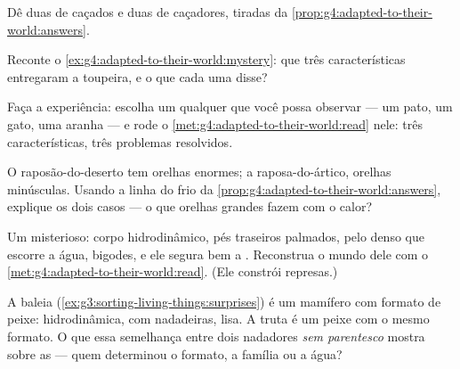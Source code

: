 \begin{exercise}[$\star$]\label{exo:g4:adapted-to-their-world:6}
Dê duas  de  caçados e duas de caçadores, tiradas
da \cref{prop:g4:adapted-to-their-world:answers}.
\end{exercise}

\begin{exercise}[$\star$]\label{exo:g4:adapted-to-their-world:7}
Reconte o \cref{ex:g4:adapted-to-their-world:mystery}: que três
características entregaram a toupeira, e o que cada uma disse?
\end{exercise}

\begin{exercise}[$\star$]\label{exo:g4:adapted-to-their-world:8}
Faça a experiência: escolha um  qualquer que você possa
observar --- um pato, um gato, uma aranha --- e rode o
\cref{met:g4:adapted-to-their-world:read} nele: três características,
três problemas resolvidos.
\end{exercise}

\begin{exercise}[$\star\star$]\label{exo:g4:adapted-to-their-world:9}
O raposão-do-deserto tem orelhas enormes; a raposa-do-ártico, orelhas
minúsculas. Usando a linha do frio da
\cref{prop:g4:adapted-to-their-world:answers}, explique os dois casos
--- o que orelhas grandes fazem com o calor?
\end{exercise}

\begin{exercise}[$\star\star$]\label{exo:g4:adapted-to-their-world:10}
Um  misterioso: corpo hidrodinâmico, pés traseiros palmados,
pelo denso que escorre a água, bigodes, e ele segura bem a
. Reconstrua o mundo dele com o
\cref{met:g4:adapted-to-their-world:read}. (Ele constrói represas.)
\end{exercise}

\begin{exercise}[$\star\star\star$]\label{exo:g4:adapted-to-their-world:11}
A baleia (\cref{ex:g3:sorting-living-things:surprises}) é um
mamífero com formato de peixe: hidrodinâmica, com nadadeiras, lisa. A
truta é um peixe com o mesmo formato. O que essa semelhança entre
dois nadadores \emph{sem parentesco} mostra sobre as  ---
quem determinou o formato, a família ou a água?
\end{exercise}
